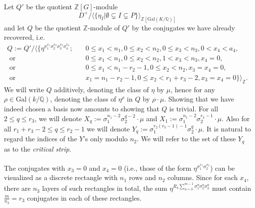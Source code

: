 \documentclass[12pt,a4paper]{article}
\theoremstyle{definition}
\newcommand{\Q}{\mathbb{Q}}
\newcommand{\Z}{\mathbb{Z}}
\newcommand{\Gal}{\mathrm{Gal}}
\begin{document}
\paragraph*{}
Let $Q'$ be the quotient $\Z[G]$-module $$D^+/\big\langle \{\eta_I \big\vert \emptyset \subsetneq I \subsetneq P \}\big\rangle_{\Z[\Gal(K/\Q)]}$$
and let $Q$ be the quotient $\Z$-module of $Q'$ by the conjugates we have already recovered, i.e.
\begin{align*}
Q:=Q'/\big\langle \{\eta^{\sigma_1^{x_1}\sigma_2^{x_2}\sigma_3^{x_3}\sigma_4^{x_4}}; \quad & 0\leq x_1< n_1, 0\leq x_2<n_2, 0\leq x_3<n_3,0< x_4<a_4,\\
\text { or }& 0\leq x_1< n_1, 0\leq x_2<n_2, 1< x_3<n_3,x_4=0,\\
\text { or }& 0\leq x_1< n_1-r_2-1, 0\leq x_2<n_2, x_3=x_4=0,\\
\text { or }& x_1= n_1-r_2-1, 0\leq x_2<r_1+r_3-2, x_3=x_4=0 \}\big\rangle_{\Z}.
\end{align*}
We will write $Q$ additively, denoting the class of $\eta$ by $\mu$, hence for any $\rho\in\Gal(k/\Q)$, denoting the class of $\eta^{\rho}$ in $Q$ by $\rho\cdot \mu$.
Showing that we have indeed chosen a basis now amounts to showing that $Q$ is trivial. For all $2\leq q\leq r_3$, we will denote $X_q:=\sigma_1^{n_1-2}\sigma_2^{q-2}\cdot \mu$ and $X_1:=\sigma_1^{n_1-2}\sigma_2^{r_3-1}\cdot \mu$. %
Also for all $r_1+r_3-2\leq q\leq r_2-1$ we will denote $Y_q:=\sigma_1^{r_2(r_3-1)-1}\sigma_2^q\cdot \mu$. It is natural to regard the indices of the $Y$'s only modulo $n_2$. We will refer to the set of these $Y_q$ %
as to the \textit{critical strip}.

\paragraph*{}
The conjugates with $x_3=0$ and $x_4=0$ (i.e., those of the form $\eta^{\sigma_1^{x_1}\sigma_2^{x_2}}$) can be visualized as a discrete rectangle with $n_1$ rows and $n_2$ columns. Since for each $x_4$, there are $n_3$ layers of such rectangles in total, the sum $\eta^{R_4\sum_{u=0}^{m-1}\sigma_1^{u}\sigma_2^{u}\sigma_3^{u}}$ must contain $\frac{m}{n_3}=r_3$ conjugates in each of these rectangles. 
\end{document}
